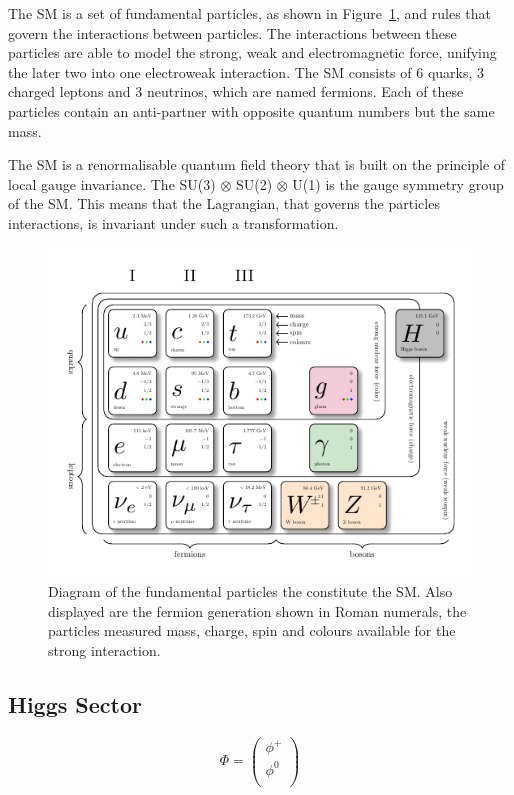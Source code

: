 The SM is a set of fundamental particles, as shown in Figure~\ref{fig:sm_diagram}, and rules that govern the interactions between particles.
The interactions between these particles are able to model the strong, weak and electromagnetic force, unifying the later two into one electroweak interaction.
The SM consists of 6 quarks, 3 charged leptons and 3 neutrinos, which are named fermions. 
Each of these particles contain an anti-partner with opposite quantum numbers but the same mass.

The SM is a renormalisable quantum field theory that is built on the principle of local gauge invariance.
The SU(3) $\otimes$ SU(2) $\otimes$ U(1) is the gauge symmetry group of the SM.
This means that the Lagrangian, that governs the particles interactions, is invariant under such a transformation.

\begin{figure}[!hbtp]
\centering
    \includegraphics[width=\textwidth]{Figures/SM_diagram.pdf}
\caption{Diagram of the fundamental particles the constitute the SM. Also displayed are the fermion generation shown in Roman numerals, the particles measured mass, charge, spin and colours available for the strong interaction.}
\label{fig:sm_diagram}
\end{figure}

\subsection{Higgs Sector}

\begin{equation}
	\Phi = 
	\begin{pmatrix} 
		\phi^{+} \\
		\phi^{0} \\
	\end{pmatrix}
\end{equation}

